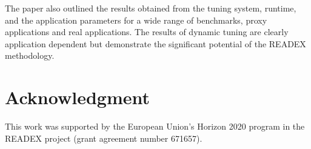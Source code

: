 \documentclass[runningheads]{llncs}
\begin{document}
The paper also outlined the results obtained from the tuning system, runtime, and the application parameters for a wide range of benchmarks, proxy applications and real applications. The results of dynamic tuning are clearly application dependent but demonstrate the significant potential of the READEX methodology.

\section*{Acknowledgment}
This work was supported by the European Union’s Horizon 2020 program in the READEX project (grant agreement number 671657).


%
 
 
\end{document}
